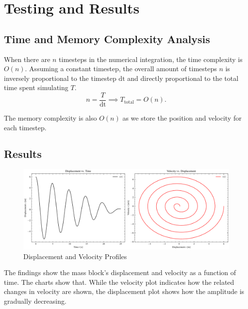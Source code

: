 \documentclass[12pt, a4paper, oneside]{report}
\begin{document}
\section{Testing and Results}

\subsection{Time and Memory Complexity Analysis}

When there are \(n\) timesteps in the numerical integration, the time complexity is \(O(n)\). Assuming a constant timestep, the overall amount of timesteps \(n\) is inversely proportional to the timestep \(\text{dt}\) and directly proportional to the total time spent simulating \(T\).
\[
	n = \frac{T}{\text{dt}} \implies T_{\text{total}} = O(n).
\]

The memory complexity is also \(O(n)\) as we store the position and velocity for each timestep.

\subsection{Results}

\begin{figure}[ht!]
	\centering
	\begin{adjustbox}{width=1.1\textwidth, center}
		\includegraphics{figures/displacement_vs_time_and_velocity_vs_displacement.pdf}
	\end{adjustbox}
	\caption{Displacement and Velocity Profiles}
	\label{fig:displacement_velocity}
\end{figure}

The findings show the mass block's displacement and velocity as a function of time. The charts show that. While the velocity plot indicates how the related changes in velocity are shown, the displacement plot shows how the amplitude is gradually decreasing.
\end{document}

